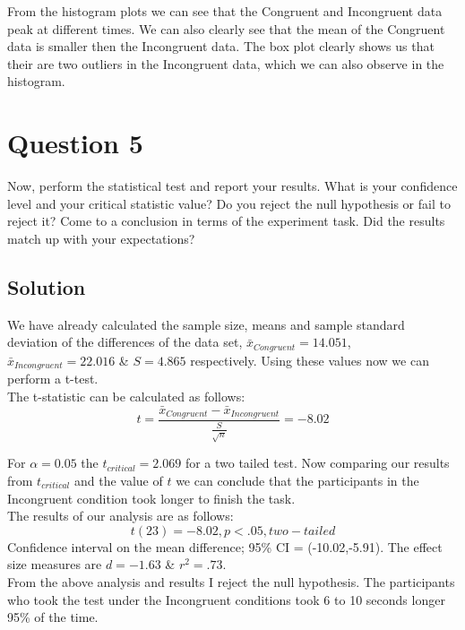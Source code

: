 \documentclass[12pt]{article}%
\begin{document}
From the histogram plots we can see that the Congruent and Incongruent data peak at different times. We can also clearly see that the mean of the Congruent data is smaller then the Incongruent data. The box plot clearly shows us that their are two outliers in the Incongruent data, which we can also observe in the histogram.  
 
 
\section*{Question 5}
Now, perform the statistical test and report your results. What is your confidence level and your critical statistic value? Do you reject the null hypothesis or fail to reject it? Come to a conclusion in terms of the experiment task. Did the results match up with your expectations?

\subsection*{Solution}

We have already calculated the sample size, means and sample standard deviation of the differences of the data set,  $\bar{x}_{Congruent} = 14.051$, $\bar{x}_{Incongruent} = 22.016$ \& $S = 4.865$ respectively. Using these values now we can perform a t-test.\\

The t-statistic can be calculated as follows:
   \begin{equation}
     t = \frac{\bar{x}_{Congruent} - \bar{x}_{Incongruent}}{\frac{S}{\sqrt{n}}} = -8.02
   \end{equation} 
 
For $\alpha=0.05$ the $t_{critical} = 2.069$ for a two tailed test. Now comparing our results from $t_{critical}$ and the value of $t$ we can conclude that the participants in the Incongruent condition took longer to finish the task.\\

The results of our analysis are as follows:
   \begin{equation}
     t(23) = -8.02, p < .05, two-tailed
   \end{equation} 
Confidence interval on the mean difference; 95\% CI = (-10.02,-5.91). The effect size measures are $d = -1.63$ \& $r^{2} = .73$.\\

From the above analysis and results I reject the null hypothesis. The participants who took the test under the Incongruent conditions took 6 to 10 seconds longer 95\% of the time.
\end{document}
